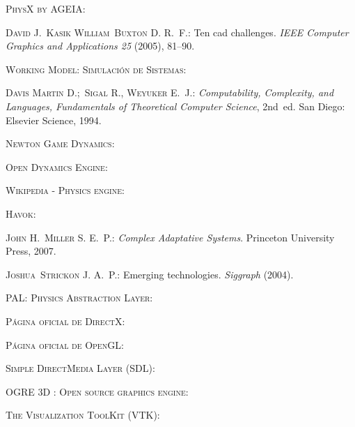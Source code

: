 \documentclass{egpubl}
\begin{document}
\begin{thebibliography}{\uppercase{JHM07}}

\textsc{PhysX by AGEIA}:

\textsc{David J.~Kasik William~Buxton D. R.~F.}:
\newblock Ten cad challenges.
\newblock \emph{IEEE Computer Graphics and Applications 25} (2005), 81--90.

\textsc{Working Model: Simulaci\'on de Sistemas}:

\textsc{Davis Martin D.;~Sigal R., Weyuker E.~J.}:
\newblock \emph{Computability, Complexity, and Languages, Fundamentals of
  Theoretical Computer Science}, 2nd~ed.
\newblock San Diego: Elsevier Science, 1994.

\textsc{Newton Game Dynamics}:

\textsc{Open Dynamics Engine}:

\textsc{Wikipedia - Physics engine}:

\textsc{Havok}:

\textsc{John H.~Miller S. E.~P.}:
\newblock \emph{Complex Adaptative Systems}.
\newblock Princeton University Press, 2007.

\textsc{Joshua~Strickon J. A.~P.}:
\newblock Emerging technologies.
\newblock \emph{Siggraph} (2004).

\textsc{PAL: Physics Abstraction Layer}:

\textsc{P\'agina oficial de DirectX}:

\textsc{P\'agina oficial de OpenGL}:

\textsc{Simple DirectMedia Layer (SDL)}:

\textsc{OGRE 3D : Open source graphics engine}:

\textsc{The Visualization ToolKit (VTK)}:


\end{thebibliography}
\end{document}
